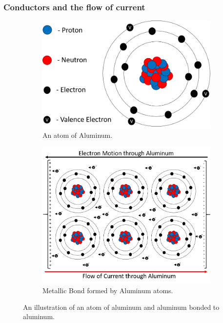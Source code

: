 \documentclass[12pt]{article}
\begin{document}
\subsubsection{Conductors and the flow of current}
\begin{figure}[H]
\begin{subfigure}{.5\textwidth}
  \includegraphics[width=0.95\linewidth]{photos/prelim/Aluminum.png}
  \caption{An atom of Aluminum.}
\end{subfigure}%
\begin{subfigure}{.5\textwidth}
  \centering
  \includegraphics[width=0.88\linewidth]{photos/prelim/metallicbond.png}
  \caption{Metallic Bond formed by Aluminum atoms.}
\end{subfigure}
\caption{An illustration of an atom of aluminum and aluminum bonded to aluminum.}
\end{figure}
\end{document}
